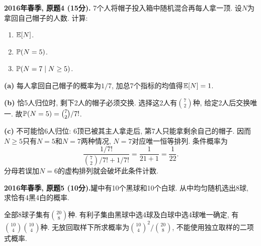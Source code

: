\begin{exercise}\label{ex:m1-2016s-q4}
\textbf{2016年春季, 原题4 (15分).} 7个人将帽子投入箱中随机混合再每人拿一顶. 设$N$为拿回自己帽子的人数. 计算:
\begin{enumerate}\item[(a)]\label{ex:m1-2016s-q4-a} $\mathbb E[N]$.\item[(b)]\label{ex:m1-2016s-q4-b} $\mathbb P(N=5)$.\item[(c)]\label{ex:m1-2016s-q4-c} $\mathbb P(N=7\mid N\ge5)$.\end{enumerate}
\end{exercise}
\begin{solution}
\textbf{(a)}\label{sol:m1-2016s-q4-a} 每人拿回自己帽子的概率为$1/7$, 加总7个指标的均值得$\mathbb E[N]=1$.

\textbf{(b)}\label{sol:m1-2016s-q4-b} 恰5人归位时, 剩下2人的帽子必须交换. 选择这2人有$\binom72$种, 给定2人后交换唯一. 故$\mathbb P(N=5)=\binom72/7!$.

\textbf{(c)}\label{sol:m1-2016s-q4-c} 不可能恰6人归位: 6顶已被其主人拿走后, 第7人只能拿剩余自己的帽子. 因而$N\ge5$只有$N=5$和$N=7$两种情况, $N=7$对应唯一恒等排列. 条件概率为
\[
\frac{1/7!}{\binom72/7!+1/7!}=\frac1{21+1}=\frac1{22}.
\]
分母若误加$N=6$的虚构排列就会破坏此条件计数.
\end{solution}

\begin{exercise}\label{ex:m1-2016s-q5}
\textbf{2016年春季, 原题5 (10分).}罐中有10个黑球和10个白球. 从中均匀随机选出8球, 求恰有4黑4白的概率.
\end{exercise}
\begin{solution}
\label{sol:m1-2016s-q5}
全部8球子集有$\binom{20}{8}$种. 有利子集由黑球中选4球及白球中选4球唯一确定, 有$\binom{10}{4}\binom{10}{4}$种. 无放回取样下所求概率为$\binom{10}{4}^2/\binom{20}{8}$, 不能使用独立取样的二项式概率.
\end{solution}

